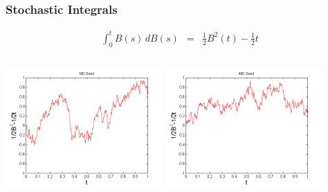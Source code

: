\documentclass{beamer}   %
\begin{document}
\begin{frame}
    \frametitle{Stochastic Integrals}
    \vspace{-7mm}
    \hspace{-6mm}
	\begin{eqnarray*}
		\int^t_0 B(s)\,dB(s) &=& \frac{1}{2}B^{2}(t)-\frac{1}{2}t		
	\end{eqnarray*}
\includegraphics[height=6cm,width=6cm]{wdw_100}
\includegraphics[height=6cm,width=6cm]{wdw_400} 
\end{frame}
\end{document}
